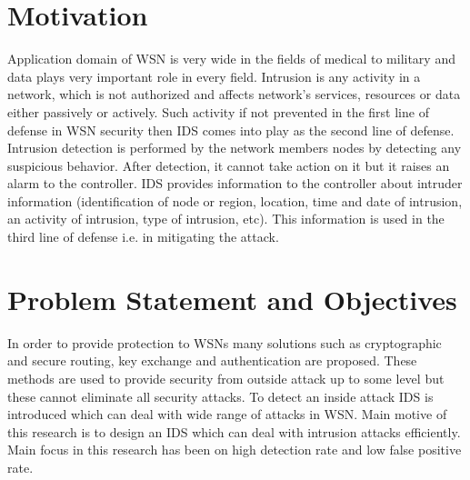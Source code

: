 \section{Motivation}
Application domain of WSN is very wide in the fields of medical to military and data plays very important role in every field. Intrusion is any activity in a network, which is not authorized and affects network's services, resources or data either passively or actively. Such activity if not prevented in the first line of defense in WSN security then IDS comes into play as the second line of defense. Intrusion detection is performed by the network members nodes by detecting any suspicious behavior. After detection, it cannot take action on it but it raises an alarm to the controller. IDS provides information to the controller about intruder information (identification of node or region, location, time and date of intrusion, an activity of intrusion, type of intrusion, etc). This information is used in the third line of defense i.e. in mitigating the attack.

\section{Problem Statement and Objectives}
In order to provide protection to WSNs many solutions such as cryptographic and secure routing, key exchange and authentication are proposed. These methods are used to provide security from outside attack up to some level but these cannot eliminate all security attacks. To detect an inside attack IDS is introduced which can deal with wide range of attacks in WSN. Main motive of this research is to design an IDS which can deal with intrusion attacks efficiently. Main focus in this research has been on high detection rate and low false positive rate.
